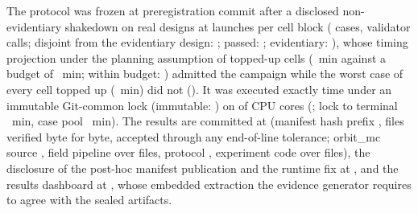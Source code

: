 The protocol was frozen at preregistration commit \texttt{\WlhPreregCommit} after a
disclosed non-evidentiary shakedown on \WlhShakedownDesigns{} real designs at
\WlhShakedownBlock{} launches per cell block (\WlhShakedownCases{} cases,
\WlhShakedownValidators{} validator calls; disjoint from the evidentiary design:
\WlhShakedownDisjoint; passed: \WlhShakedownPassed; evidentiary:
\WlhShakedownEvidentiary), whose timing projection under the planning assumption of
\WlhPlanningToppedFraction{} topped-up cells (\WlhTimingProjectedMin~min against a budget
of \WlhTimingBudgetMin~min; within budget: \WlhTimingWithinBudget) admitted the
campaign while the worst case of every cell topped up (\WlhTimingWorstMin~min) did not
(\WlhTimingWorstWithinBudget). It was executed exactly \WlhAttemptCount{} time under an
immutable Git-common lock (immutable: \WlhLockImmutable) on \WlhWorkerPool{} of
\WlhCpuCount{} CPU cores (\texttt{\WlhDevice}; lock to terminal \WlhExecutionWallMin~min,
case pool \WlhCasesWallMin~min). The results are committed at
\texttt{\WlhResultsCommit} (manifest hash prefix \texttt{\WlhManifestSha},
\WlhVerifiedFiles{} files verified byte for byte, \WlhToleratedEolFiles{} accepted
through any end-of-line tolerance; orbit\_mc source \texttt{\WlhOrbitMcSourceSha}, field
pipeline \texttt{\WlhFieldPipelineSha} over \WlhFieldPipelineFiles{} files, protocol
\texttt{\WlhProtocolSha}, experiment code \texttt{\WlhExperimentCodeSha} over
\WlhExperimentCodeFiles{} files), the disclosure of the post-hoc manifest publication
and the runtime fix at \texttt{\WlhDisclosureCommit}, and the results dashboard at
\texttt{\WlhDashboardCommit}, whose embedded extraction the evidence generator requires
to agree with the sealed artifacts.

